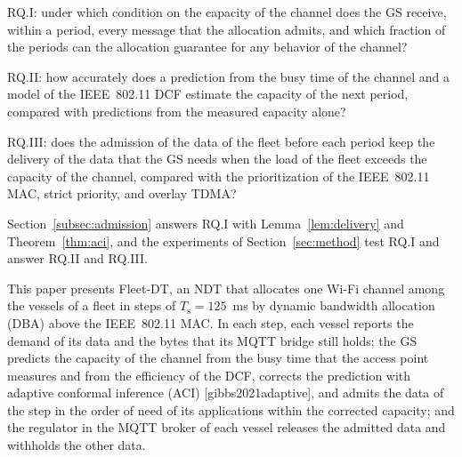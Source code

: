 \noindent RQ.I: under which condition on the capacity of the channel does the GS receive, within a period, every message that the allocation admits, and which fraction of the periods can the allocation guarantee for any behavior of the channel?

\noindent RQ.II: how accurately does a prediction from the busy time of the channel and a model of the IEEE~802.11 DCF estimate the capacity of the next period, compared with predictions from the measured capacity alone?

\noindent RQ.III: does the admission of the data of the fleet before each period keep the delivery of the data that the GS needs when the load of the fleet exceeds the capacity of the channel, compared with the prioritization of the IEEE~802.11 MAC, strict priority, and overlay TDMA?

\noindent Section~\ref{subsec:admission} answers RQ.I with Lemma~\ref{lem:delivery} and Theorem~\ref{thm:aci}, and the experiments of Section~\ref{sec:method} test RQ.I and answer RQ.II and RQ.III.

This paper presents Fleet-DT, an NDT that allocates one Wi-Fi channel among the vessels of a fleet in steps of $T_{\mathrm{s}} = 125$~ms by dynamic bandwidth allocation (DBA) above the IEEE~802.11 MAC. In each step, each vessel reports the demand of its data and the bytes that its MQTT bridge still holds; the GS predicts the capacity of the channel from the busy time that the access point measures and from the efficiency of the DCF, corrects the prediction with adaptive conformal inference (ACI) [gibbs2021adaptive], and admits the data of the step in the order of need of its applications within the corrected capacity; and the regulator in the MQTT broker of each vessel releases the admitted data and withholds the other data.

